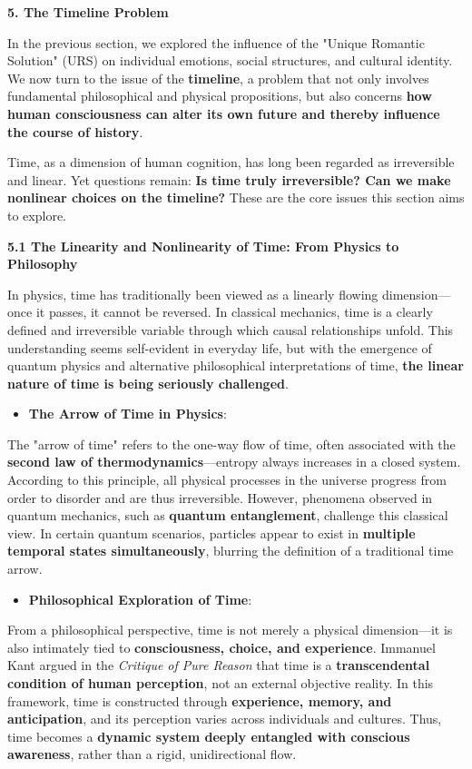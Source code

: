 \documentclass[
]{article}
\begin{document}
\textbf{5. The Timeline Problem}

In the previous section, we explored the influence of the "Unique
Romantic Solution" (URS) on individual emotions, social structures, and
cultural identity. We now turn to the issue of the \textbf{timeline}, a
problem that not only involves fundamental philosophical and physical
propositions, but also concerns \textbf{how human consciousness can
alter its own future and thereby influence the course of history}.

Time, as a dimension of human cognition, has long been regarded as
irreversible and linear. Yet questions remain: \textbf{Is time truly
irreversible? Can we make nonlinear choices on the timeline?} These are
the core issues this section aims to explore.

\textbf{5.1 The Linearity and Nonlinearity of Time: From Physics to
Philosophy}

In physics, time has traditionally been viewed as a linearly flowing
dimension---once it passes, it cannot be reversed. In classical
mechanics, time is a clearly defined and irreversible variable through
which causal relationships unfold. This understanding seems self-evident
in everyday life, but with the emergence of quantum physics and
alternative philosophical interpretations of time, \textbf{the linear
nature of time is being seriously challenged}.

\begin{itemize}
\item
  \textbf{The Arrow of Time in Physics}:
\end{itemize}

The "arrow of time" refers to the one-way flow of time, often associated
with the \textbf{second law of thermodynamics}---entropy always
increases in a closed system. According to this principle, all physical
processes in the universe progress from order to disorder and are thus
irreversible. However, phenomena observed in quantum mechanics, such as
\textbf{quantum entanglement}, challenge this classical view. In certain
quantum scenarios, particles appear to exist in \textbf{multiple
temporal states simultaneously}, blurring the definition of a
traditional time arrow.

\begin{itemize}
\item
  \textbf{Philosophical Exploration of Time}:
\end{itemize}

From a philosophical perspective, time is not merely a physical
dimension---it is also intimately tied to \textbf{consciousness, choice,
and experience}. Immanuel Kant argued in the \emph{Critique of Pure
Reason} that time is a \textbf{transcendental condition of human
perception}, not an external objective reality. In this framework, time
is constructed through \textbf{experience, memory, and anticipation},
and its perception varies across individuals and cultures. Thus, time
becomes a \textbf{dynamic system deeply entangled with conscious
awareness}, rather than a rigid, unidirectional flow.
\end{document}
